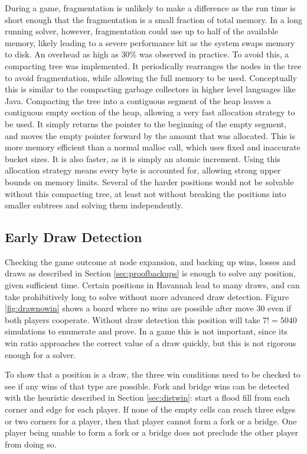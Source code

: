 During a game, fragmentation is unlikely to make a difference as the run time is short enough that the fragmentation is a small fraction of total memory. In a long running solver, however, fragmentation could use up to half of the available memory, likely leading to a severe performance hit as the system swaps memory to disk. An overhead as high as 30\% was observed in practice. To avoid this, a compacting tree was implemented. It periodically rearranges the nodes in the tree to avoid fragmentation, while allowing the full memory to be used. Conceptually this is similar to the compacting garbage collectors in higher level languages like Java. Compacting the tree into a contiguous segment of the heap leaves a contiguous empty section of the heap, allowing a very fast allocation strategy to be used. It simply returns the pointer to the beginning of the empty segment, and moves the empty pointer forward by the amount that was allocated. This is more memory efficient than a normal malloc call, which uses fixed and inaccurate bucket sizes. It is also faster, as it is simply an atomic increment. Using this allocation strategy means every byte is accounted for, allowing strong upper bounds on memory limits. Several of the harder positions would not be solvable without this compacting tree, at least not without breaking the positions into smaller subtrees and solving them independently.

\subsection{Early Draw Detection}\label{sec:drawdetect}

Checking the game outcome at node expansion, and backing up wins, losses and draws as described in Section \ref{sec:proofbackups} is enough to solve any position, given sufficient time. Certain positions in Havannah lead to many draws, and can take prohibitively long to solve without more advanced draw detection. Figure \ref{fig:drawnowin} shows a board where no wins are possible after move 30 even if both players cooperate. Without draw detection this position will take $7!=5040$ simulations to enumerate and prove. In a game this is not important, since its win ratio approaches the correct value of a draw quickly, but this is not rigorous enough for a solver.

To show that a position is a draw, the three win conditions need to be checked to see if any wins of that type are possible. Fork and bridge wins can be detected with the heuristic described in Section \ref{sec:distwin}: start a flood fill from each corner and edge for each player. If none of the empty cells can reach three edges or two corners for a player, then that player cannot form a fork or a bridge. One player being unable to form a fork or a bridge does not preclude the other player from doing so.

